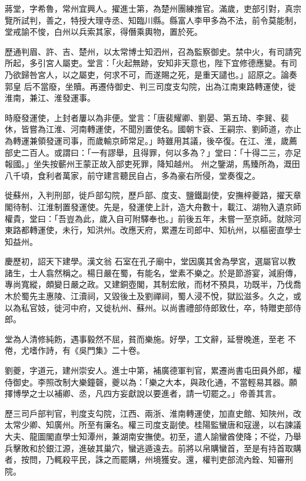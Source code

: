 \begin{pinyinscope}
 蔣堂，字希魯，常州宜興人。擢進士第，為楚州團練推官。滿歲，吏部引對，真宗覽所試判，善之，特授大理寺丞、知臨川縣。縣富人李甲多為不法，前令莫能制，堂戒諭不悛，白州以兵索其家，得僭乘輿物，置於死。



 歷通判眉、許、吉、楚州，以太常博士知泗州，召為監察御史。禁中火，有司請究所起，多引宮人屬吏。堂言：「火起無跡，安知非天意也，陛下宜修德應變。有司乃欲歸咎宮人，以之屬吏，何求不可，而遂賜之死，是重天譴也。」詔原之。論奏郭皇
 后不當廢，坐贖。再遷侍御史、判三司度支勾院，出為江南東路轉運使，徙淮南，兼江、淮發運事。



 時廢發運使，上封者屢以為非便。堂言：「唐裴耀卿、劉晏、第五琦、李巽、裴休，皆嘗為江淮、河南轉運使，不聞別置使名。國朝卞袞、王嗣宗、劉師道，亦止為轉運兼領發運司事，而歲輸京師常足。」時雖用其議，後卒復。在江、淮，歲薦部史二百人。或謂曰：「一有謬舉，且得罪，何以多為？」堂曰：「十得二三，亦足報國。」坐失按蘄州王蒙正故入部吏死罪，降知越州。
 州之鑒湖，馬臻所為，溉田八千頃，食利者萬家，前守建言聽民自占，多為豪右所侵，堂奏復之。



 徙蘇州，入判刑部，徙戶部勾院，歷戶部、度支、鹽鐵副使，安撫梓夔路，擢天章閣待制、江淮制置發運使。先是，發運使上計，造大舟數十，載江、湖物入遺京師權貴，堂曰：「吾豈為此，歲入自可附驛奉也。」前後五年，未嘗一至京師。就除河東路都轉運使，未行，知洪州。改應天府，累遷左司郎中、知杭州，以樞密直學士知益州。



 慶歷初，詔天下建學。漢文翁
 石室在孔子廟中，堂因廣其舍為學宮，選屬官以教諸生，士人翕然稱之。楊日嚴在蜀，有能名，堂素不樂之。於是節游宴，減廚傳，專尚寬縱，頗變日嚴之政。又建銅壺閣，其制宏敞，而材不預具，功既半，乃伐喬木於蜀先主惠陵、江瀆祠，又毀後土及劉禪祠，蜀人浸不悅，獄訟滋多。久之，或以為私官妓，徙河中府，又徙杭州、蘇州。以尚書禮部侍郎致仕，卒，特贈吏部侍郎。



 堂為人清修純飭，遇事毅然不屈，貧而樂施。好學，工文辭，延譽晚進，至老
 不倦，尤嗜作詩，有《吳門集》二十卷。



 劉夔，字道元，建州崇安人。進士中第，補廣德軍判官，累遷尚書屯田員外郎，權侍御史。李照改制大樂鐘磬，夔以為：「樂之大本，與政化通，不當輕易其器。願擇博學之士以補卿、丞，凡四方妄獻說以要進者，請一切罷之。」帝善其言。



 歷三司戶部判官，判度支勾院，江西、兩浙、淮南轉運使，加直史館、知陜州，改太常少卿、知廣州。所至有廉名。權三司度支副使。桂陽監蠻唐和寇邊，以右諫議
 大夫、龍圖閣直學士知潭州，兼湖南安撫使。初至，遣人諭蠻酋使降；不從，乃舉兵擊敗和於銀江源，進破其巢穴，蠻逃遁遠去。前將以帛購蠻首，至是有持首取購者，按問，乃輒殺平民，誅之而罷購，州境獲安。還，權判吏部流內銓、知審刑院。




\end{pinyinscope}
